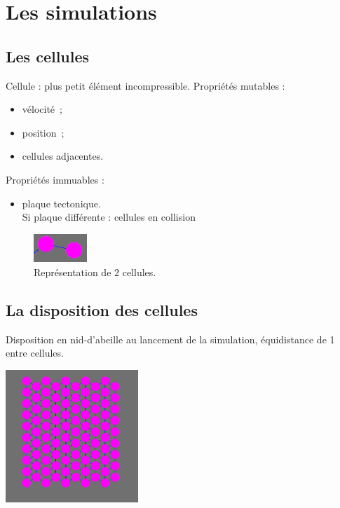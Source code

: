 \documentclass{beamer}
\begin{document}
\section{Les simulations}

\subsection{Les cellules}
\begin{frame}
  Cellule : plus petit élément incompressible.
   \smallbreak
  Propriétés mutables :
  \begin{itemize}
   \item vélocité~;
   \item position~;
   \item cellules adjacentes.
  \end{itemize}
  Propriétés immuables :
  \begin{itemize}
   \item plaque tectonique.\\
   Si plaque différente : cellules en collision
  \end{itemize}
  \begin{figure}
    \begin{center}
      \includegraphics[width=2cm]{Images/cellule.png}
    \end{center}
    \caption{Représentation de 2 cellules.}
  \end{figure}
\end{frame}

\subsection{La disposition des cellules}
\begin{frame}
  Disposition en nid-d'abeille au lancement de la simulation, équidistance de 1 entre cellules.
  \begin{center}
    \includegraphics[width=5cm]{Images/hexagone.png}
  \end{center}
\end{frame}
\end{document}
